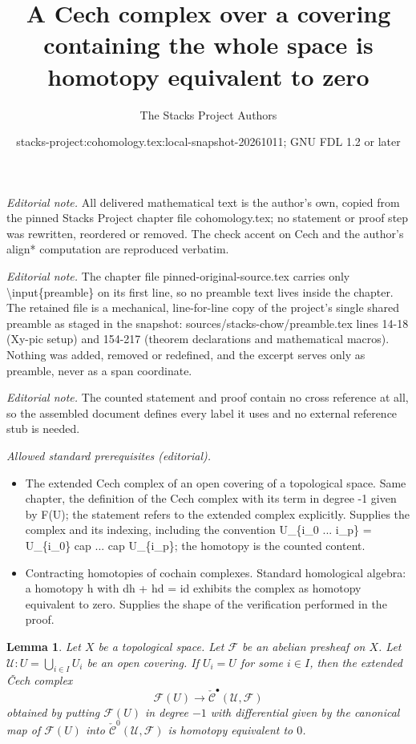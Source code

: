 \documentclass[10pt,a4paper]{amsart}
\title{A Cech complex over a covering containing the whole space is homotopy equivalent to zero}
\author{The Stacks Project Authors}
\date{stacks-project:cohomology.tex:local-snapshot-20261011; GNU FDL 1.2 or later}
\theoremstyle{plain}
\newtheorem{lemma}[subsection]{Lemma}
\theoremstyle{definition}
\theoremstyle{remark}
\numberwithin{equation}{subsection}
\begin{document}
\maketitle
\noindent\textit{Editorial note.} All delivered mathematical text is the author's own, copied from the pinned Stacks Project chapter file cohomology.tex; no statement or proof step was rewritten, reordered or removed. The check accent on Cech and the author's align* computation are reproduced verbatim.\par\medskip
\noindent\textit{Editorial note.} The chapter file pinned-original-source.tex carries only \textbackslash{}input\{preamble\} on its first line, so no preamble text lives inside the chapter. The retained file is a mechanical, line-for-line copy of the project's single shared preamble as staged in the snapshot: sources/stacks-chow/preamble.tex lines 14-18 (Xy-pic setup) and 154-217 (theorem declarations and mathematical macros). Nothing was added, removed or redefined, and the excerpt serves only as preamble, never as a span coordinate.\par\medskip
\noindent\textit{Editorial note.} The counted statement and proof contain no cross reference at all, so the assembled document defines every label it uses and no external reference stub is needed.\par\medskip
\noindent\textit{Allowed standard prerequisites (editorial).}\begin{itemize}
\item The extended Cech complex of an open covering of a topological space. Same chapter, the definition of the Cech complex with its term in degree -1 given by F(U); the statement refers to the extended complex explicitly. Supplies the complex and its indexing, including the convention U\_\{i\_0 ... i\_p\} = U\_\{i\_0\} cap ... cap U\_\{i\_p\}; the homotopy is the counted content.
\item Contracting homotopies of cochain complexes. Standard homological algebra: a homotopy h with dh + hd = id exhibits the complex as homotopy equivalent to zero. Supplies the shape of the verification performed in the proof.
\end{itemize}\medskip
\begin{lemma}
\label{lemma-cech-trivial}
Let $X$ be a topological space. Let $\mathcal{F}$ be an abelian presheaf on $X$.
Let $\mathcal{U} : U = \bigcup_{i \in I} U_i$ be an open covering. If
$U_i = U$ for some $i \in I$, then the extended {\v C}ech complex
$$
\mathcal{F}(U) \to \check{\mathcal{C}}^\bullet(\mathcal{U}, \mathcal{F})
$$
obtained by putting $\mathcal{F}(U)$ in degree $-1$ with differential given by
the canonical map of $\mathcal{F}(U)$ into
$\check{\mathcal{C}}^0(\mathcal{U}, \mathcal{F})$
is homotopy equivalent to $0$.
\end{lemma}
\end{document}
